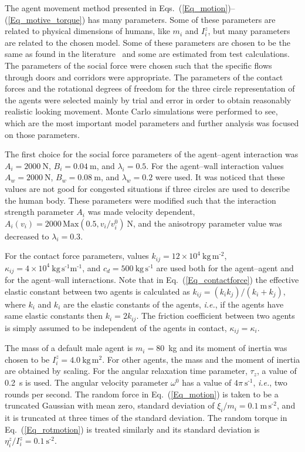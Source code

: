 \documentclass[12pt,a4paper,final,twoside]{stylevk}
\begin{document}
The agent movement method presented in
Eqs.~(\ref{Eq_motion})--(\ref{Eq_motive_torque}) has many parameters.
Some of these parameters are related to physical dimensions of humans,
like $m_i$ and $I^z_{i}$, but many parameters are related to the
chosen model.  Some of these parameters are chosen to be the same as
found in the literature~\cite{Helbing00,Langston06} and some are
estimated from test calculations.  The parameters of the social force
were chosen such that the specific flows through doors and corridors
were appropriate.  The parameters of the contact forces and the
rotational degrees of freedom for the three circle representation of
the agents were selected mainly by trial and error in order to obtain
reasonably realistic looking movement.  Monte Carlo simulations were
performed to see, which are the most important model parameters and
further analysis was focused on those parameters.


The first choice for the social force parameters of the agent--agent
interaction was $A_i = 2000~\textrm{N}$, $B_i = 0.04~\textrm{m}$, and
$\lambda_i = 0.5$.  For the agent--wall interaction values $A_w =
2000~\textrm{N}$, $B_w = 0.08~\textrm{m}$, and $\lambda_w = 0.2$ were
used.  It was noticed that these values are not good for congested
situations if three circles are used to describe the human body.
These parameters were modified such that the interaction strength
parameter $A_i$ was made velocity dependent, $A_i(v_i) = 2000\,
\mathrm{Max}(0.5, v_i/v^0_i)~\textrm{N}$, and the anisotropy parameter
value was decreased to $\lambda_i = 0.3$.


For the contact force parameters, values $k_{ij} = 12 \times 10^4
~\mathrm{ \textrm{kg} \, \textrm{m}^\textrm{-2} }$, $\kappa_{ij} = 4
\times 10^4 ~\mathrm{ \textrm{kg} \, \textrm{s}^\textrm{-1}
  \textrm{m}^\textrm{-1} } $, and $c_d = 500 ~\mathrm{\textrm{kg} \,
  \textrm{s}^\textrm{-1} } $ are used both for the agent--agent and
for the agent--wall interactions.  Note that in
Eq.~(\ref{Eq_contactforce}) the effective elastic constant between two
agents is calculated as $k_{ij} = (k_i k_j)/(k_i+k_j)$, where $k_i$
and $k_i$ are the elastic constants of the agents, \emph{i.e.}, if the
agents have same elastic constants then $k_{i} = 2 k_{ij}$.  The
friction coefficient between two agents is simply assumed to be
independent of the agents in contact, $\kappa_{ij} = \kappa_i$.


The mass of a default male agent is $m_i = 80$~kg and its moment of
inertia was chosen to be $I^z_{i} = 4.0 ~\mathrm{ \textrm{kg} \,
  \textrm{m}^\textrm{2} }$.  For other agents, the mass and the moment
of inertia are obtained by scaling.  For the angular relaxation time
parameter, $\tau_z$, a value of 0.2~s is used.  The angular velocity
parameter $\omega^0$ has a value of $4\pi~\mathrm{
  \textrm{s}^\textrm{-1} } $, \emph{i.e.}, two rounds per second.  The
random force in Eq.~(\ref{Eq_motion}) is taken to be a truncated
Gaussian with mean zero, standard deviation of $ {\xi}_i/m_i = 0.1
~\mathrm{ \textrm{m} \, \textrm{s}^\textrm{-2}}$, and it is truncated
at three times of the standard deviation.  The random torque in
Eq.~(\ref{Eq_rotmotion}) is treated similarly and its standard deviation
is $ {\eta}^z_{i}/ I^z_{i} = 0.1 ~\mathrm{ \textrm{s}^\textrm{-2}}$.
\end{document}
